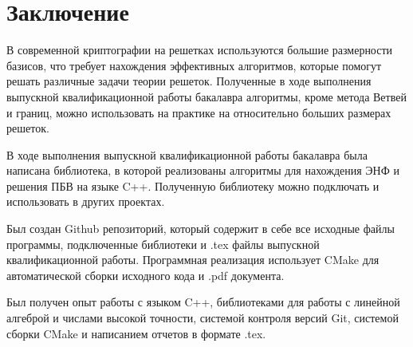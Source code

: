 \newpage

\section{Заключение}

В современной криптографии на решетках используются большие размерности базисов, что требует нахождения эффективных алгоритмов, которые помогут решать различные задачи теории решеток. Полученные в ходе выполнения выпускной квалификационной работы бакалавра алгоритмы, кроме метода Ветвей и границ, можно использовать на практике на относительно больших размерах решеток.

В ходе выполнения выпускной квалификационной работы бакалавра была написана библиотека, в которой реализованы алгоритмы для нахождения ЭНФ и решения ПБВ на языке C++. Полученную библиотеку можно подключать и использовать в других проектах.

Был создан Github репозиторий, который содержит в себе все исходные файлы программы, подключенные библиотеки и .tex файлы выпускной квалификационной работы. Программная реализация использует CMake для автоматической сборки исходного кода и .pdf документа.

Был получен опыт работы с языком C++, библиотеками для работы с линейной алгеброй и числами высокой точности, системой контроля версий Git, системой сборки CMake и написанием отчетов в формате .tex.

\clearpage
